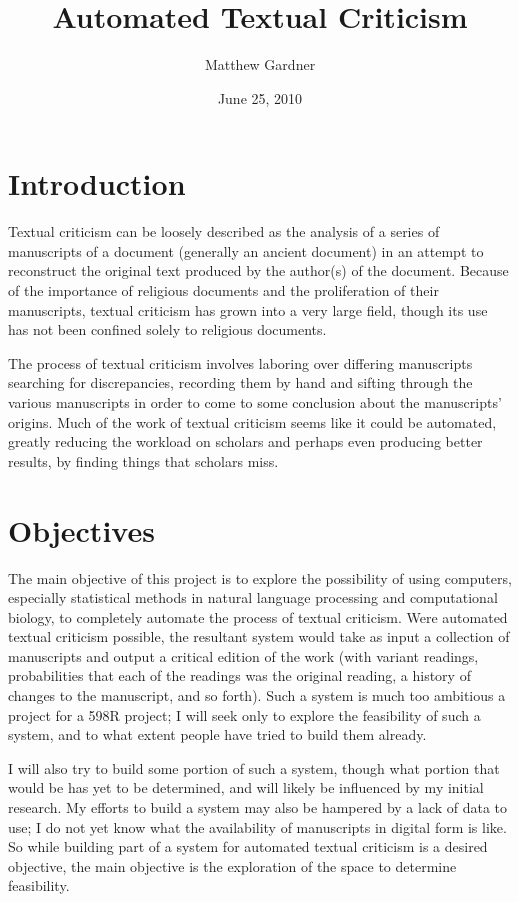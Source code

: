 \documentclass[onecolumn, 11pt]{article}
\title{Automated Textual Criticism}
\author{Matthew Gardner}
\date{June 25, 2010}
\begin{document}
\maketitle

\section{Introduction}

Textual criticism can be loosely described as the analysis of a series of
manuscripts of a document (generally an ancient document) in an attempt to
reconstruct the original text produced by the author(s) of the document.
Because of the importance of religious documents and the proliferation of their
manuscripts, textual criticism has grown into a very large field, though its
use has not been confined solely to religious documents.

The process of textual criticism involves laboring over differing manuscripts
searching for discrepancies, recording them by hand and sifting through the
various manuscripts in order to come to some conclusion about the manuscripts'
origins.  Much of the work of textual criticism seems like it could be
automated, greatly reducing the workload on scholars and perhaps even producing
better results, by finding things that scholars miss.

\section{Objectives}

The main objective of this project is to explore the possibility of using
computers, especially statistical methods in natural language processing and
computational biology, to completely automate the process of textual criticism.
Were automated textual criticism possible, the resultant system would take as
input a collection of manuscripts and output a critical edition of the work
(with variant readings, probabilities that each of the readings was the
original reading, a history of changes to the manuscript, and so forth).  Such
a system is much too ambitious a project for a 598R project; I will seek only
to explore the feasibility of such a system, and to what extent people have
tried to build them already.

I will also try to build some portion of such a system, though what portion
that would be has yet to be determined, and will likely be influenced by my
initial research.  My efforts to build a system may also be hampered by a lack
of data to use; I do not yet know what the availability of manuscripts in
digital form is like.  So while building part of a system for automated textual
criticism is a desired objective, the main objective is the exploration of the
space to determine feasibility.
\end{document}
